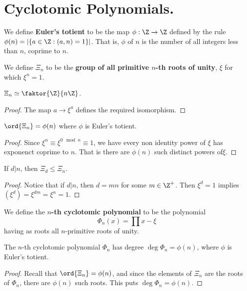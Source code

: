 \section{Cyclotomic Polynomials.}

\begin{definition}
    We define \textbf{Euler's totient} to be the map $\phi:\Z \xrightarrow{} \Z$
    defined by the rule $\phi(n)=|\{a \in \Z : (a,n)=1\}|$. That is, $\phi$
    of  $n$ is the number of all integers less than  $n$, coprime to  $n$.
\end{definition}

\begin{definition}
    We define $\Xi_n$ to be the \textbf{group of all primitive $n$-th roots of
    unity}, $\xi$ for which  $\xi^n=1$.
\end{definition}

\begin{lemma}\label{1.7.1}
    $\Xi_n \simeq \faktor{\Z}{n\Z}$.
\end{lemma}
\begin{proof}
    The map $a \xrightarrow{} \xi^a$ defines the required isomorphism.
\end{proof}
\begin{corollary}
    $\ord{\Xi_n}=\phi(n)$ where $\phi$ is Euler's totient.
\end{corollary}
\begin{proof}
    Since $\xi^n \equiv \xi^{0 \mod{n}} \equiv 1$, we have every non identity
    power of $\xi$ has exponenct coprime to  $n$. That is there are $\phi(n)$
    such distinct powers of$\xi$.
\end{proof}
\begin{corollary}
    If $d|n$, then  $\Xi_d \leq \Xi_n$.
\end{corollary}
\begin{proof}
    Notice that if $d|n$, then $d=mn$ for some  $m \in \Z^+$. Then $\xi^d=1$
    implies  $(\xi^d)=\xi^{dm}=\xi^n=1$.
\end{proof}

\begin{definition}
    We define the \textbf{$n$-th cyclotomic polynomial} to be the polynomial
    \begin{equation*}
        \Phi_n(x)=\prod{x-\xi}
    \end{equation*}
    having as roots all $n$-primitive roots of unity.
\end{definition}

\begin{lemma}\label{1.7.2}
    The $n$-th cyclotomic polynomial  $\Phi_n$ has degree
    $\deg{\Phi_n}=\phi(n)$, where $\phi$ is Euler's totient.
\end{lemma}
\begin{proof}
    Recall that $\ord{\Xi_n}=\phi(n)$, and since the elements of $\Xi_n$ are the
    roots of  $\Phi_n$, there are  $\phi(n)$ such roots. This puts
    $\deg{\Phi_n}=\phi(n)$.
\end{proof}

